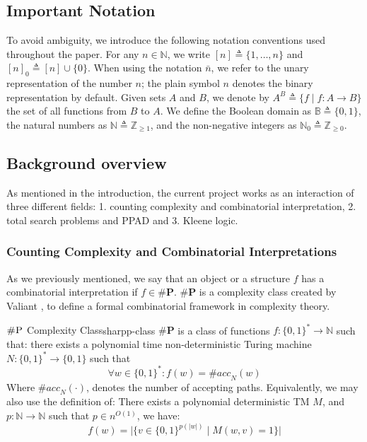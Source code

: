 
\subsection{Important Notation}

To avoid ambiguity, we introduce the following notation conventions used throughout the paper.
For any $n \in \mathbb{N}$, we write $[n] \triangleq \{1, \ldots, n\}$  and $[n]_0 \triangleq [n] \cup \{0\}$. 
When using the notation $\bar{n}$, we refer to the unary representation of the number $n$; the plain symbol $n$
denotes the binary representation by default.
Given sets $A$ and $B$, we denote by $A^B \triangleq \{ f \mid f : A \to B \}$
the set of all functions from $B$ to $A$.
We define the Boolean domain as $\mathbb{B} \triangleq \{0, 1\}$,
the natural numbers as $\mathbb{N} \triangleq \mathbb{Z}_{\geq 1}$,
and the non-negative integers as $\mathbb{N}_0 \triangleq \mathbb{Z}_{\geq 0}$.


\subsection{Background overview}
As mentioned in the introduction, the current project works as an interaction
of three different fields: 1. counting complexity and combinatorial interpretation, 
2. total search problems and PPAD and 3. Kleene logic.


\subsubsection{Counting Complexity and Combinatorial Interpretations}
As we previously mentioned, we say that an object or a structure $f$
has a combinatorial interpretation if $f \in \textbf{\#P}$. $\textbf{\#P}$
is a complexity class created by Valiant \cite{valiant_complexity_1979},
to define a formal combinatorial framework in complexity theory.


\begin{definitionbox}{$\textsc{\#P}$ Complexity Class}{sharpp-class}
    $\textbf{\#P}$ is a class of functions $f: \{0,1\}^* \to \mathbb{N}$
    such that: there exists a polynomial time non-deterministic
    Turing machine $N: \{0,1\}^* \to \{0,1\}$ such that
    $$
    \forall w \in \{0,1\}^*: f(w) = \textit{\#acc}_N(w)
    $$
    Where $\textit{\#acc}_N(\cdot)$, denotes the number of accepting paths.
    Equivalently, we may also use the definition of: There
    exists a polynomial deterministic TM $M$, and
    $p : \mathbb{N} \to \mathbb{N}$ such that $p \in n^{O(1)}$, we have:
    $$
    f(w) = \Big|\Big\{v \in \{0,1\}^{p(|w|)} \mid M(w, v) =1 \Big\}\Big|
    $$
\end{definitionbox}

